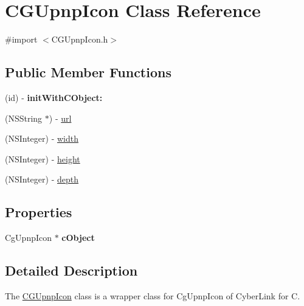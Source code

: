 \hypertarget{interface_c_g_upnp_icon}{\section{C\-G\-Upnp\-Icon Class Reference}
\label{interface_c_g_upnp_icon}
}


{\ttfamily \#import $<$C\-G\-Upnp\-Icon.\-h$>$}

\subsection*{Public Member Functions}
\begin{DoxyCompactItemize}
\item 
\hypertarget{interface_c_g_upnp_icon_a2b06ce3849b988746e98b3a930952436}{(id) -\/ {\bfseries init\-With\-C\-Object\-:}}\label{interface_c_g_upnp_icon_a2b06ce3849b988746e98b3a930952436}

\item 
(N\-S\-String $\ast$) -\/ \hyperlink{interface_c_g_upnp_icon_a34182c615bf51e2d15b2a729016fa589}{url}
\item 
(N\-S\-Integer) -\/ \hyperlink{interface_c_g_upnp_icon_af76c11e7c306cdf258f768e10bcbb868}{width}
\item 
(N\-S\-Integer) -\/ \hyperlink{interface_c_g_upnp_icon_a5776473e8bcd2108d60d70fa336da855}{height}
\item 
(N\-S\-Integer) -\/ \hyperlink{interface_c_g_upnp_icon_a8328344b3f1ae9d0b7c71747bdf397d3}{depth}
\end{DoxyCompactItemize}
\subsection*{Properties}
\begin{DoxyCompactItemize}
\item 
\hypertarget{interface_c_g_upnp_icon_ae111abb04689a9a5cd97e4b653ca595f}{Cg\-Upnp\-Icon $\ast$ {\bfseries c\-Object}}\label{interface_c_g_upnp_icon_ae111abb04689a9a5cd97e4b653ca595f}

\end{DoxyCompactItemize}


\subsection{Detailed Description}
The \hyperlink{interface_c_g_upnp_icon}{C\-G\-Upnp\-Icon} class is a wrapper class for Cg\-Upnp\-Icon of Cyber\-Link for C. 

